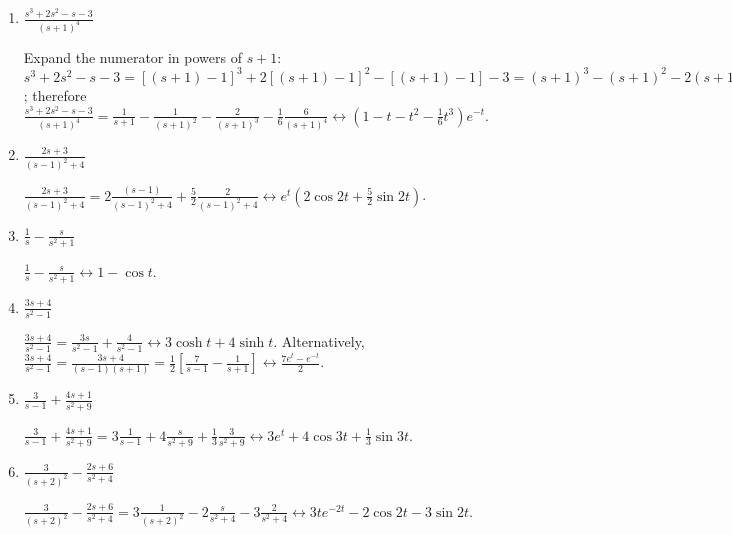 \documentclass{ximera}
\begin{document}
\begin{problem}
\begin{enumerate}
    \item $\frac{s^3+2s^2-s-3}{(s+1)^4}$

\begin{solution}
Expand the numerator in powers of $s+1$:
$s^3+2s^2-s-3=[(s+1)-1]^3+2[(s+1)-1]^2-[(s+1)-1]-3=
(s+1)^3-(s+1)^2-2(s+1)-1$; therefore
$\frac{s^3+2s^2-s-3}{(s+1)^4}=\frac{1}{s+1}-\frac{1}{(s+1)^2}
-\frac{2}{(s+1)^3}-\frac{1}{6}\frac{6}{(s+1)^4}\leftrightarrow
{\left(1-t-t^2-\frac{1}{6}t^3\right)e^{-t}}$.
\end{solution}

    \item $\frac{2s+3}{(s-1)^2+4}$

\begin{solution}
$\frac{2s+3}{(s-1)^2+4}=2\frac{(s-1)}{(s-1)^2+4}
+\frac{5}{2}\frac{2}{(s-1)^2+4}\leftrightarrow
{e^t\left(2\cos 2t+\frac{5}{2}\sin 2t\right)}$.  
\end{solution}

    \item $\frac{1}{s}-\frac{s}{s^2+1}$

\begin{solution}
$\frac{1}{s}-\frac{s}{s^2+1}\leftrightarrow 1-\cos t$. 
\end{solution}

    \item $\frac{3s+4}{s^2-1}$

\begin{solution}
$\frac{3s+4}{s^2-1}=\frac{3s}{s^2-1}+\frac{4}{s^2-1}
\leftrightarrow3\cosh t+4\sinh t$.
Alternatively,
$\frac{3s+4}{s^2-1}=\frac{3s+4}{(s-1)(s+1)}=\frac{1}{2}\left[\frac{7}{s-1}-\frac{1}{s+1}\right]
\leftrightarrow\frac{7e^t-e^{-t}}{2}$. 
\end{solution}

    \item $\frac{3}{s-1}+\frac{4s+1}{s^2+9}$

\begin{solution}
$\frac{3}{s-1}+\frac{4s+1}{s^2+9}=3\frac{1}{s-1}
+4\frac{s}{s^2+9}+\frac{1}{3}\frac{3}{s^2+9}\leftrightarrow
3e^t+4\cos 3t+\frac{1}{3}\sin 3t$. 
\end{solution}

    \item $\frac{3}{(s+2)^2}-\frac{2s+6}{s^2+4}$

\begin{solution}
$\frac{3}{(s+2)^2}-\frac{2s+6}{s^2+4}=
3\frac{1}{(s+2)^2}-2\frac{s}{s^2+4}-3\frac{2}{s^2+4}\leftrightarrow
3te^{-2t}-2\cos 2t-3\sin 2t$.
\end{solution}
\end{enumerate}
\end{problem}
\end{document}
